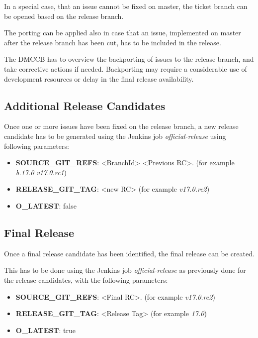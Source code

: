 In a special case, that an issue cannot be fixed on master, the ticket branch can be opened based on the release branch.

The porting can be applied also in case that an issue, implemented on master after the release branch has been cut, has to be included in the release.

The DMCCB has to overview the backporting of issues to the release branch, and take corrective actions if needed. Backporting may require a considerable use of development resources or delay in the final release availability.


\subsection{Additional Release Candidates} \label{sec:newrc}

Once one or more issues have been fixed on the release branch, a new release candidate has to be generated using the Jenkins job \textit{official-release} using following parameters:

\begin{itemize}
\item {\bf SOURCE\_GIT\_REFS}: <BranchId> <Previous RC>. (for example \textit{b.17.0 v17.0.rc1})
\item {\bf RELEASE\_GIT\_TAG}: <new RC> (for example \textit{v17.0.rc2})
\item {\bf O\_LATEST}: false
\end{itemize}

\subsection{Final Release} \label{sec:finalrelease}

Once a final release candidate has been identified, the final release can be created.

This has to be done using the Jenkins job \textit{official-release} as previously done for the release candidates, with the following parameters:

\begin{itemize}
\item {\bf SOURCE\_GIT\_REFS}: <Final RC>. (for example \textit{v17.0.rc2})
\item {\bf RELEASE\_GIT\_TAG}: <Release Tag> (for example \textit{17.0})
\item {\bf O\_LATEST}: true
\end{itemize}

\newpage

